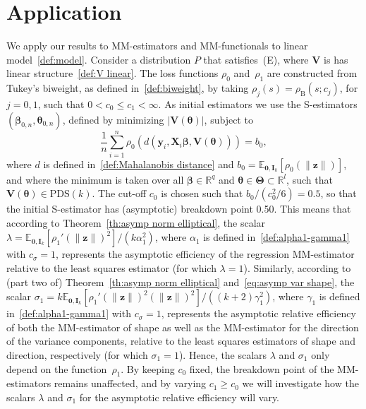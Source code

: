 \documentclass{article}
\numberwithin{equation}{section}
\theoremstyle{plain}
\newcommand{\R}{\mathbb{R}}
\newcommand{\bbeta}{\bm\beta}
\newcommand{\btheta}{\bm\theta}
\newcommand{\bTheta}{\bm\Theta}
\newcommand{\by}{\mathbf{y}}
\newcommand{\bz}{\mathbf{z}}
\newcommand{\bX}{\mathbf{X}}
\newcommand{\bV}{\mathbf{V}}
\newcommand{\bI}{\mathbf{I}}
\newcommand{\E}{\mathbb{E}}
\begin{document}
\section{Application}
\label{sec:application}
We apply our results to MM-estimators and MM-functionals to linear model~\eqref{def:model}.
Consider a distribution $P$ that satisfies~(E), where $\bV$ is has linear structure~\eqref{def:V linear}.
The loss functions $\rho_0$ and~$\rho_1$ are constructed from Tukey's biweight, as defined in~\eqref{def:biweight}, by taking
$\rho_j(s)=\rho_{\text{B}}(s;c_j)$, for $j=0,1$, such that $0<c_0\leq c_1<\infty$.
As initial estimators we use the S-estimators $(\bbeta_{0,n},\btheta_{0,n})$,
defined by minimizing $|\bV(\btheta)|$, subject to
\[
\frac{1}{n}
\sum_{i=1}^{n}
\rho_0\left(
d(\by_i,\bX_i\bbeta,\bV(\btheta))
\right)
=
b_0,
\]
where $d$ is defined in~\eqref{def:Mahalanobis distance} and $b_0=\E_{\mathbf{0},\bI_k}[\rho_0(\|\bz\|)]$,
and where the minimum is taken over all $\bbeta\in\R^{q}$ and $\btheta\in\bTheta\subset\R^l$,
such that $\bV(\btheta)\in\text{PDS}(k)$.
The cut-off $c_0$ is chosen such that $b_0/(c_0^2/6)=0.5$, so that the initial S-estimator has (asymptotic) breakdown point 0.50.
This means that according to Theorem~\ref{th:asymp norm elliptical},
the scalar $\lambda=\E_{\mathbf{0},\bI_k}[\rho_1'(\|\bz\|)^2]/(k\alpha_1^2)$,
where $\alpha_1$ is defined in~\eqref{def:alpha1-gamma1} with $c_\sigma=1$, 
represents the asymptotic efficiency of the regression MM-estimator relative to
the least squares estimator (for which $\lambda=1$).
Similarly, according to (part two of) Theorem~\ref{th:asymp norm elliptical} and~\eqref{eq:asymp var shape}, the scalar $\sigma_1=k\E_{\mathbf{0},\bI_k}\left[\rho_1'(\|\bz\|)^2(\|\bz\|)^2\right]/((k+2)\gamma_1^2)$,
where $\gamma_1$ is defined in~\eqref{def:alpha1-gamma1} with $c_\sigma=1$,
represents the asymptotic relative efficiency of both the MM-estimator of shape
as well as the MM-estimator for the direction of the variance components, relative
to the least squares estimators of shape and direction, respectively (for which $\sigma_1=1$).
Hence, the scalars $\lambda$ and $\sigma_1$ only depend on the function~$\rho_1$.
By keeping $c_0$ fixed, the breakdown point of the MM-estimators remains unaffected,
and by varying $c_1\geq c_0$ we will investigate how the scalars $\lambda$ and $\sigma_1$ for the asymptotic relative efficiency 
will vary.
\end{document}
